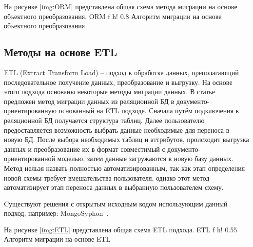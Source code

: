 На рисунке \ref{img:ORM} представлена общая схема метода миграции на основе объектного преобразования.
    {ORM} %
    {f} %
    {h!} %
    {0.8\textwidth} %
{Алгоритм миграции на основе объектного преобразования} %

\clearpage

\subsection{Методы на основе ETL}
ETL (Extract Transform Load) -- подход к обработке данных, преполагающий последовательное получение данных, преобразование и выгрузку.
На основе этого подхода основаны некоторые методы миграции данных.
В статье~\cite{etl} предложен метод миграции данных из реляционной БД в документо-ориентированную основанный на ETL подходе.
Сначала путём подключения к реляционной БД получается структура таблиц.
Далее пользователю предоставляется возможность выбрать данные необходимые для переноса в новую БД.
После выбора необходимых таблиц и аттрибутов, происходит выгрузка данных и преобразование их в формат совместимый с документо-ориентированной моделью, затем данные загружаются в новую базу данных. 
Метод нельзя назвать полностью автоматизированным, так как этап определения новой схемы требует вмешательства пользователя, однако этот метод автоматизирует этап переноса данных в выбранную пользователем схему.

Cуществуют решения с открытым исходным кодом использующим данный подход, например: MongoSyphon~\cite{mongosyphon}.

На рисунке \ref{img:ETL} представлена общая схема ETL подхода.
    {ETL} %
    {f} %
    {h!} %
    {0.55\textwidth} %
    {Алгоритм миграции на основе ETL} %

\clearpage

